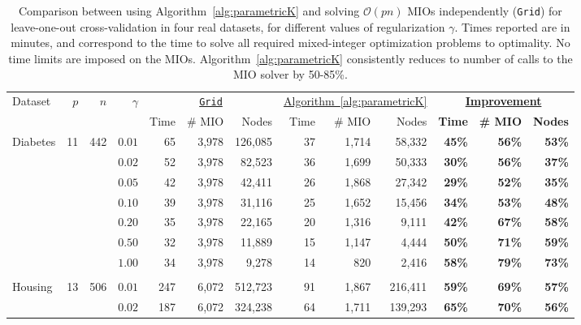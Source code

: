 \documentclass[ijoc,noblindrev]{informs3} %
\begin{document}
	\begin{table}
    [h!]\footnotesize
    \begin{center}
 \caption{Comparison between using Algorithm~\ref{alg:parametricK} and solving $\mathcal{O}(pn)$ MIOs independently (\texttt{Grid}) for leave-one-out cross-validation in four real datasets, for different values of regularization $\gamma$. Times reported are in minutes, and correspond to the time to solve all required mixed-integer optimization problems to optimality. No time limits are imposed on the MIOs. Algorithm~\ref{alg:parametricK} consistently reduces to number of calls to the MIO solver by 50-85\%.}
 \label{tab:gridVsAlg}
	\setlength{\tabcolsep}{2pt}
	\begin{tabular}{l r r r|r r r | r r r  | r r r }
		
		\hline
		\multirow{2}{*}{Dataset}&\multirow{2}{*}{$p$}&\multirow{2}{*}{$n$}&\multirow{2}{*}{$\gamma$}& \multicolumn{3}{c|}{\underline{\texttt{Grid}}}&\multicolumn{3}{c|}{\underline{Algorithm~\ref{alg:parametricK}}}&\multicolumn{3}{c}{\textbf{\underline{Improvement}}}\\
		&&&&Time&\# MIO&Nodes&Time&\# MIO&Nodes&\textbf{Time}&\textbf{\# MIO}&\textbf{Nodes}\\
		\hline
			\multirow{7}{*}{Diabetes}&\multirow{7}{*}{11}&\multirow{7}{*}{442}&
		$0.01$&65&3,978&126,085&37&1,714&58,332&\textbf{45\%}&\textbf{56\%}&\textbf{53\%}\\
		&&&$0.02$&52&3,978&82,523&36&1,699&50,333&\textbf{30\%}&\textbf{56\%}&\textbf{37\%}\\
		&&&$0.05$&42&3,978&42,411&26&1,868&27,342&\textbf{29\%}&\textbf{52\%}&\textbf{35\%}\\
		&&&$0.10$&39&3,978&31,116&25&1,652&15,456&\textbf{34\%}&\textbf{53\%}&\textbf{48\%}\\
		&&&$0.20$&35&3,978&22,165&20&1,316&9,111&\textbf{42\%}&\textbf{67\%}&\textbf{58\%}\\
		&&&$0.50$&32&3,978&11,889&15&1,147&4,444&\textbf{50\%}&\textbf{71\%}&\textbf{59\%}\\
		&&&$1.00$&34&3,978&9,278&14&820&2,416&\textbf{58\%}&\textbf{79\%}&\textbf{73\%}\\
		&&&&&&&&&&&&\\
		\multirow{7}{*}{Housing}&\multirow{7}{*}{13}&\multirow{7}{*}{506}&
		$0.01$&247&6,072&512,723&91&1,867&216,411&\textbf{59\%}&\textbf{69\%}&\textbf{57\%}\\
		&&&$0.02$&187&6,072&324,238&64&1,711&139,293&\textbf{65\%}&\textbf{70\%}&\textbf{56\%}\\

\end{tabular}
\end{center}
\end{table}
\end{document}
